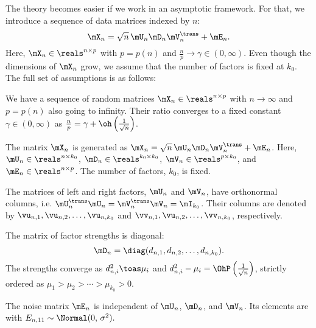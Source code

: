 The theory becomes easier if we work in an asymptotic framework.  For that,
we introduce a sequence of data matrices indexed by $n$:
\[
    \mX_{n} = \sqrt{n} \, \mU_n \mD_n \mV_n^\trans + \mE_n.
\]
Here, $\mX_n \in \reals^{n \times p}$ with $p = p(n)$ and 
$\frac{n}{p} \to \gamma \in (0,\infty)$.  Even though the dimensions of $\mX_n$ grow, we assume that the number of factors is fixed at $k_0$.  The full set of assumptions is as follows:

\begin{assumption}\label{A:optimal-leave-out-shapes}
    We have a sequence of random matrices $\mX_n \in \reals^{n \times p}$ 
    with $n \to \infty$ and $p = p(n)$ also going to infinity.  Their ratio
    converges to a fixed constant $\gamma \in (0, \infty)$ as 
    $\frac{n}{p} = \gamma + \oh\left( \frac{1}{\sqrt{n}} \right)$.
\end{assumption}

\begin{assumption}
    The matrix $\mX_n$ is generated as 
    $\mX_n = \sqrt{n} \, \mU_n \mD_n \mV_n^\trans + \mE_n$.  Here,
    $\mU_n \in \reals^{n \times k_0}$, 
    $\mD_n \in \reals^{k_0 \times k_0}$,
    $\mV_n \in \reals^{p \times k_0}$, and $\mE_n \in \reals^{n \times p}$.
    The number of factors, $k_0$, is fixed.
\end{assumption}

\begin{assumption}
    The matrices of left and right factors, $\mU_n$ and $\mV_n$, have 
    orthonormal columns, i.e. 
    $\mU_n^\trans \mU_n = \mV_n^\trans \mV_n = \mI_{k_0}$.
    Their columns are denoted by
    $\vu_{n,1}, \vu_{n,2}, \ldots, \vu_{n,k_0}$ and
    $\vv_{n,1}, \vu_{n,2}, \ldots, \vv_{n,k_0}$, respectively.
\end{assumption}

\begin{assumption}
    The matrix of factor strengths is diagonal:
    \[
        \mD_n = \diag( d_{n,1}, d_{n,2}, \ldots, d_{n,k_0}).  
    \]
    The strengths
    converge as $d_{n,i}^2 \toas \mu_i$ and 
    $d_{n,i}^2 - \mu_i = \OhP\left( \frac{1}{\sqrt{n}} \right)$, strictly
    ordered as
    \(
        \mu_1 > \mu_2 > \cdots > \mu_{k_0} > 0.
    \)
\end{assumption}

\begin{assumption}\label{A:optimal-leave-out-noise}
    The noise matrix $\mE_n$ is independent of $\mU_n$, $\mD_n$, and $\mV_n$.
    Its elements are \iid with 
    \(
        E_{n,11} \sim \Normal( 0, \, \sigma^2 ).
    \)
\end{assumption}

